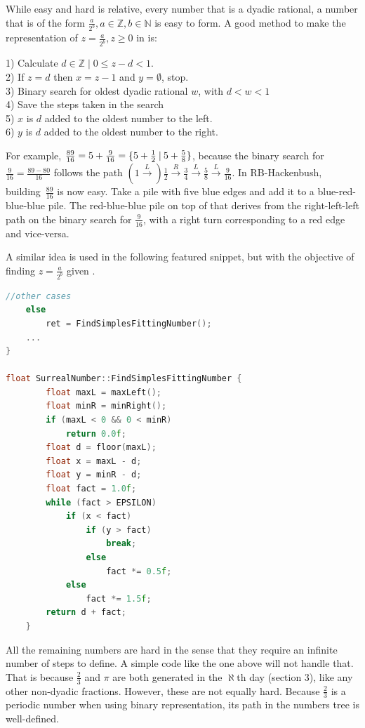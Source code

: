 While easy and hard is relative, every number that is a dyadic rational, a number that is of the form $\frac{a}{2^b}, a\in\mathbb{Z}, b \in \mathbb{N}$ is easy to form. A good method to make the representation of $z = \frac{a}{2^b}, z \ge 0$ in  is:\\
\begin{adjustwidth}{2cm}{}
	1) Calculate $d\in \mathbb{Z}\;|\;0 \leq z-d < 1$.\\
	2) If $z=d$ then $x = z-1$ and $y=\emptyset$, stop.\\ 
	3) Binary search for oldest dyadic rational $w$, with $d < w < 1$\\
	4) Save the steps taken in the search \\
	5) $x$ is $d$ added to the oldest number to the left.\\
	6) $y$ is $d$ added to the oldest number to the right.
\end{adjustwidth} \vspace{0.5cm}

For example, $\frac{89}{16} = 5 + \frac{9}{16} = \mbox{$\{5 + \frac{1}{2}\:|\:5+\frac{5}{8}\}$}$, because the binary search for \mbox{$\frac{9}{16} = \frac{89-80}{16}$} follows the path $(1\xrightarrow[]{L})\frac{1}{2}\xrightarrow[]{R} \frac{3}{4}\xrightarrow[]{L}\frac{5}{8}\xrightarrow[]{L}\frac{9}{16}$. In RB-Hackenbush, building~$\frac{89}{16}$ is now easy. Take a pile with five blue edges and add it to a blue-red-blue-blue pile. The red-blue-blue pile on top of that derives from the right-left-left path on the binary search for $\frac{9}{16}$, with a right turn corresponding to a red edge and vice-versa.

A similar idea is used in the following featured snippet, but with the objective of finding $z = \frac{a}{2^b}$ given .

\begin{lstlisting}[language=C++]
	//other cases
	else
		ret = FindSimplesFittingNumber();
	...
}

float SurrealNumber::FindSimplesFittingNumber {
		float maxL = maxLeft();
		float minR = minRight();
		if (maxL < 0 && 0 < minR)
			return 0.0f;
		float d = floor(maxL);
		float x = maxL - d;
		float y = minR - d;
  		float fact = 1.0f;
		while (fact > EPSILON)
			if (x < fact)
				if (y > fact)
					break;
				else
					fact *= 0.5f;
			else
				fact *= 1.5f;
		return d + fact;
	}
\end{lstlisting}

All the remaining numbers are hard in the sense that they require an infinite number of steps to define. A simple code like the one above will not handle that. That is because $\frac{2}{3}$ and $\pi$ are both generated in the $\aleph$th day (section 3), like any other non-dyadic fractions. However, these are not equally hard. Because $\frac{2}{3}$ is a periodic number when using binary representation, its path in the numbers tree is well-defined.

